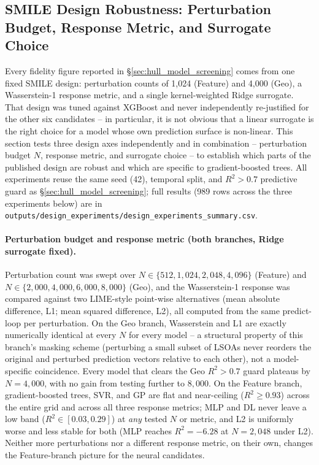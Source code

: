 \subsection{SMILE Design Robustness: Perturbation Budget, Response Metric, and Surrogate Choice}
\label{sec:hull_smile_design_experiments}

Every fidelity figure reported in \S\ref{sec:hull_model_screening} comes from
one fixed SMILE design: perturbation counts of 1{,}024 (Feature) and 4{,}000
(Geo), a Wasserstein-1 response metric, and a single kernel-weighted Ridge
surrogate. That design was tuned against XGBoost and never independently
re-justified for the other six candidates -- in particular, it is not obvious
that a linear surrogate is the right choice for a model whose own
prediction surface is non-linear. This section tests three design axes
independently and in combination -- perturbation budget $N$, response metric,
and surrogate choice -- to establish which parts of the published design are
robust and which are specific to gradient-boosted trees. All experiments
reuse the same seed (42), temporal split, and $R^2>0.7$ predictive guard as
\S\ref{sec:hull_model_screening}; full results (989 rows across the three
experiments below) are in
\texttt{outputs/design\_experiments/design\_experiments\_summary.csv}.

\paragraph{Perturbation budget and response metric (both branches, Ridge
surrogate fixed).} Perturbation count was swept over $N\in\{512, 1{,}024,
2{,}048, 4{,}096\}$ (Feature) and $N\in\{2{,}000, 4{,}000, 6{,}000, 8{,}000\}$
(Geo), and the Wasserstein-1 response was compared against two LIME-style
point-wise alternatives (mean absolute difference, L1; mean squared
difference, L2), all computed from the same predict-loop per perturbation.
On the Geo branch, Wasserstein and L1 are exactly numerically identical at
every $N$ for every model -- a structural property of this branch's masking
scheme (perturbing a small subset of LSOAs never reorders the original and
perturbed prediction vectors relative to each other), not a model-specific
coincidence. Every model that clears the Geo $R^2>0.7$ guard plateaus by
$N=4{,}000$, with no gain from testing further to $8{,}000$. On the Feature
branch, gradient-boosted trees, SVR, and GP are flat and near-ceiling
($R^2\ge0.93$) across the entire grid and across all three response metrics;
MLP and DL never leave a low band ($R^2\in[0.03,0.29]$) at \emph{any} tested
$N$ or metric, and L2 is uniformly worse and less stable for both (MLP
reaches $R^2=-6.28$ at $N{=}2{,}048$ under L2). Neither more perturbations nor
a different response metric, on their own, changes the Feature-branch
picture for the neural candidates.

